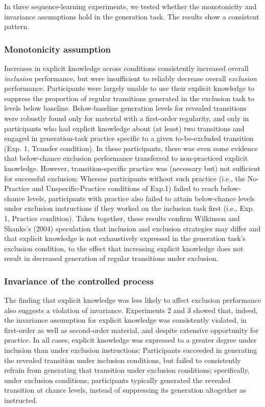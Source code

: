 \documentclass[man]{apa6}
\theoremstyle{definition}
\theoremstyle{definition}
\theoremstyle{definition}
\theoremstyle{remark}
\begin{document}
In three sequence-learning experiments, we tested whether the
monotonicity and invariance assumptions hold in the generation task. The
results show a consistent pattern.

\subsubsection{Monotonicity assumption}\label{monotonicity-assumption}

Increases in explicit knowledge across conditions consistently increased
overall \emph{inclusion} performance, but were insufficient to reliably
decrease overall \emph{exclusion} performance. Participants were largely
unable to use their explicit knowledge to suppress the proportion of
regular transitions generated in the exclusion task to levels below
baseline. Below-baseline generation levels for revealed transitions were
robustly found only for material with a first-order regularity, and only
in participants who had explicit knowledge about (at least) two
transitions and engaged in generation-task practice specific to a given
to-be-excluded transition (Exp. 1, Transfer condition). In these
participants, there was even some evidence that below-chance exclusion
performance transferred to non-practiced explicit knowledge. However,
transition-specific practice was (necessary but) not sufficient for
successful exclusion: Whereas participants without such practice (i.e.,
the No-Practice and Unspecific-Practice conditions of Exp.1) failed to
reach below-chance levels, participants with practice also failed to
attain below-chance levels under exclusion instructions if they worked
on the inclusion task first (i.e., Exp. 1, Practice condition). Taken
together, these results confirm Wilkinson and Shanks's (2004)
speculation that inclusion and exclusion strategies may differ and that
explicit knowledge is not exhaustively expressed in the generation
task's exclusion condition, to the effect that increasing explicit
knowledge does not result in decreased generation of regular transitions
under exclusion.

\subsubsection{Invariance of the controlled
process}\label{invariance-of-the-controlled-process}

The finding that explicit knowledge was less likely to affect exclusion
performance also suggests a violation of invariance. Experiments 2 and 3
showed that, indeed, the invariance assumption for explicit knowledge
was consistently violated, in first-order as well as second-order
material, and despite extensive opportunity for practice. In all cases,
explicit knowledge was expressed to a greater degree under inclusion
than under exclusion instructions: Participants succeeded in generating
the revealed transition under inclusion conditions, but failed to
consistently refrain from generating that transition under exclusion
conditions; specifically, under exclusion conditions, participants
typically generated the revealed transition at chance levels, instead of
suppressing its generation altogether as instructed.
\end{document}
